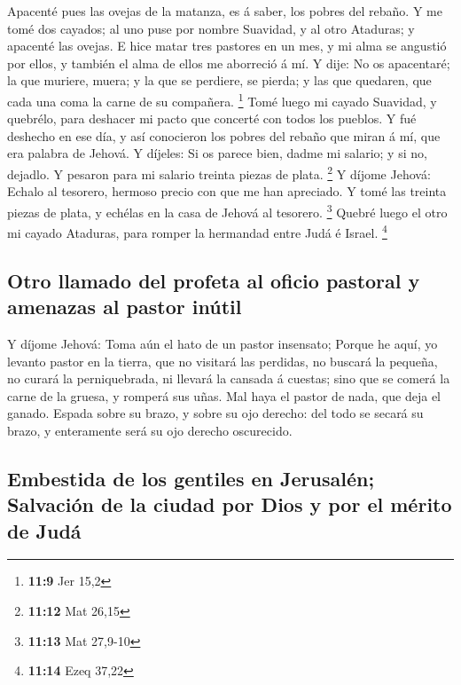  Apacenté pues las ovejas de la matanza, es á saber, los
pobres del rebaño. Y me tomé dos cayados; al uno puse por nombre
Suavidad, y al otro Ataduras; y apacenté las ovejas.  E hice
matar tres pastores en un mes, y mi alma se angustió por ellos, y
también el alma de ellos me aborreció á mí.  Y dije: No os
apacentaré; la que muriere, muera; y la que se perdiere, se pierda; y
las que quedaren, que cada una coma la carne de su compañera.
\footnote{\textbf{11:9} Jer 15,2}  Tomé luego mi cayado
Suavidad, y quebrélo, para deshacer mi pacto que concerté con todos los
pueblos.  Y fué deshecho en ese día, y así conocieron los
pobres del rebaño que miran á mí, que era palabra de Jehová.
 Y díjeles: Si os parece bien, dadme mi salario; y si no,
dejadlo. Y pesaron para mi salario treinta piezas de plata. \footnote{\textbf{11:12}
  Mat 26,15}  Y díjome Jehová: Echalo al tesorero, hermoso
precio con que me han apreciado. Y tomé las treinta piezas de plata, y
echélas en la casa de Jehová al tesorero. \footnote{\textbf{11:13} Mat
  27,9-10}  Quebré luego el otro mi cayado Ataduras, para
romper la hermandad entre Judá é Israel. \footnote{\textbf{11:14} Ezeq
  37,22}

\hypertarget{otro-llamado-del-profeta-al-oficio-pastoral-y-amenazas-al-pastor-inuxfatil}{%
\subsection{Otro llamado del profeta al oficio pastoral y amenazas al
pastor
inútil}\label{otro-llamado-del-profeta-al-oficio-pastoral-y-amenazas-al-pastor-inuxfatil}}

 Y díjome Jehová: Toma aún el hato de un pastor insensato;
 Porque he aquí, yo levanto pastor en la tierra, que no
visitará las perdidas, no buscará la pequeña, no curará la
perniquebrada, ni llevará la cansada á cuestas; sino que se comerá la
carne de la gruesa, y romperá sus uñas.  Mal haya el pastor
de nada, que deja el ganado. Espada sobre su brazo, y sobre su ojo
derecho: del todo se secará su brazo, y enteramente será su ojo derecho
oscurecido.

\hypertarget{embestida-de-los-gentiles-en-jerusaluxe9n-salvaciuxf3n-de-la-ciudad-por-dios-y-por-el-muxe9rito-de-juduxe1}{%
\subsection{Embestida de los gentiles en Jerusalén; Salvación de la
ciudad por Dios y por el mérito de
Judá}\label{embestida-de-los-gentiles-en-jerusaluxe9n-salvaciuxf3n-de-la-ciudad-por-dios-y-por-el-muxe9rito-de-juduxe1}}

